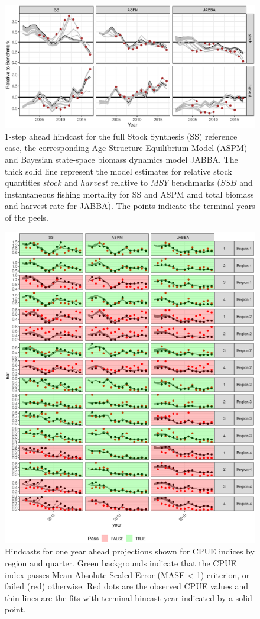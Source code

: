 \documentclass[12pt,halfline,a4paper,nonumbib]{ouparticle}
\begin{document}
\begin{figure}
\includegraphics[width=6in]{fig3.eps}
\caption{1-step ahead hindcast for the full Stock Synthesis (SS) reference case, the corresponding Age-Structure Equilibrium Model (ASPM) and Bayesian state-space biomass dynamics model JABBA.  The thick solid line represent the model estimates for relative stock quantities $stock$ and $harvest$ relative to $MSY$ benchmarks ($SSB$ and instantaneous fishing mortality for SS and ASPM amd total biomass and harvest rate for JABBA). The points indicate the terminal years of the peels.}\label{fig:fig2}
\end{figure}

\begin{figure}[htbp]
\centering
\includegraphics[width=6in]{fig4.eps}
\caption{Hindcasts for one year ahead projections shown for CPUE indices by region and quarter. Green backgrounds indicate that the CPUE index passes Mean Absolute Scaled Error (MASE < 1) criterion, or failed (red) otherwise. Red dots are the observed CPUE values and thin lines are the fits with terminal hincast year indicated by a solid point.}
\label{fig:hy}
\end{figure}
\end{document}
